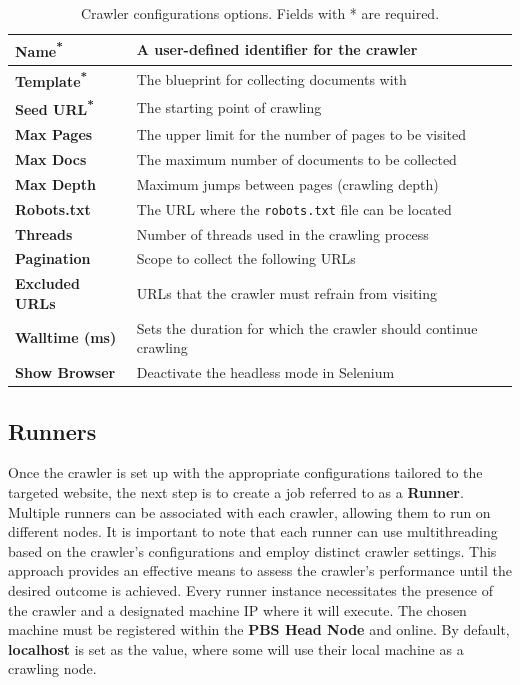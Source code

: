 \begin{table}[ht] 
\centering
{\footnotesize
\begin{tabular}{|P{2.5cm}|P{9.9cm}|}
    \hline
     \textbf{Name\textsuperscript{*}} & A user-defined identifier for the crawler  \\ \hline
     \textbf{Template\textsuperscript{*}} & The blueprint for collecting documents with \\ \hline
     \textbf{Seed URL\textsuperscript{*}} & The starting point of crawling  \\ \hline\hline
     \textbf{Max Pages} & The upper limit for the number of pages to be visited  \\ \hline
     \textbf{Max Docs} & The maximum number of documents to be collected \\ \hline
     \textbf{Max Depth} & Maximum jumps between pages (crawling depth) \\ \hline
     \textbf{Robots.txt} & The URL where the \texttt{robots.txt} file can be located  \\ \hline
     \textbf{Threads} & Number of threads used in the crawling process \\ \hline
     \textbf{Pagination} & Scope to collect the following URLs  \\ \hline
     \textbf{Excluded URLs} & URLs that the crawler must refrain from visiting \\ \hline
     \textbf{Walltime (ms)} & Sets the duration for which the crawler should continue crawling\\ \hline
     \textbf{Show Browser} & Deactivate the headless mode in Selenium \\ \hline  
\end{tabular}}
  \captionsetup{justification=centering,margin=2cm}
  \caption{Crawler configurations options. Fields with * are required.}
  \label{table:crawler-configurations}
\end{table}

\subsection{Runners}
Once the crawler is set up with the appropriate configurations tailored to the targeted website, the next step is to create a job referred to as a \textbf{Runner}. Multiple runners can be associated with each crawler, allowing them to run on different nodes. It is important to note that each runner can use multithreading based on the crawler's configurations and employ distinct crawler settings. This approach provides an effective means to assess the crawler's performance until the desired outcome is achieved. Every runner instance necessitates the presence of the crawler and a designated machine IP where it will execute. The chosen machine must be registered within the \textbf{PBS Head Node} and online. By default, \textbf{localhost} is set as the value, where some will use their local machine as a crawling node.

